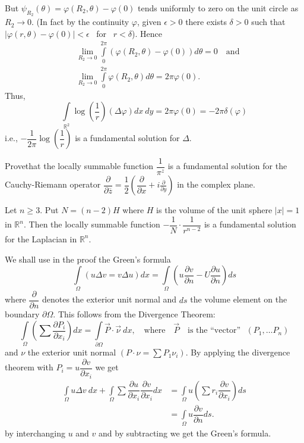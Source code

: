 But $\psi_{R_{2}}(\theta)=\varphi(R_{2},\theta)-\varphi(0)$ tends uniformly to zero on the unit circle as $R_{2}\to 0$. (In fact by the continuity $\varphi$, given $\epsilon>0$ there exists $\delta > 0$ such that $|\varphi(r,\theta)-\varphi(0)|<\epsilon$ \ for \ $r<\delta$). Hence
\begin{align*}
& \lim\limits_{R_{2}\to 0}\int\limits^{2\pi}_{0}(\varphi(R_{2},\theta)-\varphi(0))d\theta=0\quad\text{and}\\[4pt]
& \lim\limits_{R_{2}\to 0}\int\limits^{2\pi}_{0}\varphi(R_{2},\theta)d\theta=2\pi \varphi(0).
\end{align*}
Thus,
$$
\int\limits_{\mathbb{R}^{2}}\log \left(\frac{1}{r}\right)(\Delta \varphi)dx \ dy = 2\pi\varphi(0)=-2\pi \delta(\varphi)
$$
i.e., $-\dfrac{1}{2\pi}\log\left(\dfrac{1}{r}\right)$ is a fundamental solution for $\Delta$.

\begin{exer*}
Prove\pageoriginale that the locally summable function $\dfrac{1}{\pi^{z}}$ is a fundamental solution for the Cauchy-Riemann operator $\dfrac{\partial}{\partial \overline{z}}=\dfrac{1}{2}\left(\dfrac{\partial}{\partial x}+i\frac{\partial}{\partial y}\right)$ in the complex plane.
\end{exer*}

\begin{theorem}\label{chap3-thm3}
Let $n\geq 3$. Put $N=(n-2)H$ where $H$ is the volume of the unit sphere $|x|=1$ in $\mathbb{R}^{n}$. Then the locally summable function $-\dfrac{1}{N}\cdot \dfrac{1}{r^{n-2}}$ is a fundamental solution for the Laplacian in $\mathbb{R}^{n}$.
\end{theorem}

\begin{remark*}
We shall use in the proof the Green's formula
$$
\int\limits_{\Omega}(u\Delta v=v\Delta u)dx=\int\limits_{\Omega}\left(u\frac{\partial v}{\partial n}-U\frac{\partial u}{\partial n}\right)ds
$$
where $\dfrac{\partial}{\partial n}$ denotes the exterior unit normal and $ds$ the volume element on the boundary $\partial\Omega$. This follows from the Divergence Theorem:
$$
\int\limits_{\Omega}\left(\sum \frac{\partial P_{i}}{\partial x_{i}}\right)dx=\int\limits_{\partial \Omega}\overrightarrow{P}\cdot \overrightarrow{\nu} \ dx,\text{~~ where~~ } \overrightarrow{P}\text{~~ is the ``vector''~~} (P_{1},\ldots P_{n})
$$
and $\nu$ the exterior unit normal $(P\cdot \nu=\sum P_{1}\nu_{i})$. By applying the divergence theorem with $P_{i}=u\dfrac{\partial v}{\partial x_{i}}$ we get
\begin{align*}
\int\limits_{\Omega}u \Delta v \ dx+\int\limits_{\Omega}\sum \dfrac{\partial u}{\partial x_{i}}\dfrac{\partial v}{\partial x_{i}}dx &= \int\limits_{\Omega}u\left(\sum r_{i}\dfrac{\partial v}{\partial x_{i}}\right)ds\\[4pt]
&= \int\limits_{\Omega}u\dfrac{\partial v}{\partial n}ds.
\end{align*}
by interchanging $u$ and $v$ and by subtracting we get the Green's formula.
\end{remark*}

